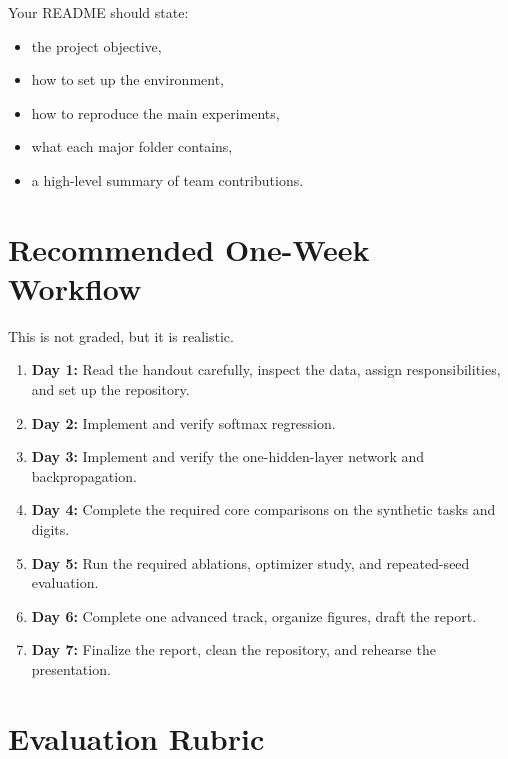 \documentclass[11pt]{article}
\begin{document}
Your README should state:

\begin{itemize}
    \item the project objective,
    \item how to set up the environment,
    \item how to reproduce the main experiments,
    \item what each major folder contains,
    \item a high-level summary of team contributions.
\end{itemize}

\section{Recommended One-Week Workflow}

This is not graded, but it is realistic.

\begin{enumerate}
    \item \textbf{Day 1:} Read the handout carefully, inspect the data, assign responsibilities, and set up the repository.
    \item \textbf{Day 2:} Implement and verify softmax regression.
    \item \textbf{Day 3:} Implement and verify the one-hidden-layer network and backpropagation.
    \item \textbf{Day 4:} Complete the required core comparisons on the synthetic tasks and digits.
    \item \textbf{Day 5:} Run the required ablations, optimizer study, and repeated-seed evaluation.
    \item \textbf{Day 6:} Complete one advanced track, organize figures, draft the report.
    \item \textbf{Day 7:} Finalize the report, clean the repository, and rehearse the presentation.
\end{enumerate}

\section{Evaluation Rubric}
\end{document}
